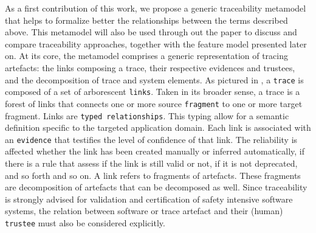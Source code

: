 As a first contribution of this work, we propose a generic traceability metamodel that helps to formalize better the relationships between the terms described above. This metamodel will also be used through out the paper to discuss and compare traceability approaches, together with the feature model presented later on. At its core, the metamodel comprises a generic representation of tracing artefacts: the links composing a trace, their respective evidences and trustees, and the decomposition of trace and system elements. As pictured in , a \texttt{trace} is composed of a set of arborescent \texttt{links}. Taken in its broader sense, a trace is a forest of links that connects one or more source \texttt{fragment} to one or more target fragment. Links are \texttt{typed relationships}. This typing allow for a semantic definition specific to the targeted application domain. %
Each link is associated with an \texttt{evidence} that testifies the level of confidence of that link. The reliability is affected whether the link has been created manually or inferred automatically, if there is a rule that assess if the link is still valid or not, if it is not deprecated, and so forth and so on. A link refers to fragments of artefacts. These fragments are decomposition of artefacts that can be decomposed as well. Since traceability is strongly advised for validation and certification of safety intensive software systems, the relation between software or trace artefact and their (human) \texttt{trustee} must also be considered explicitly.



